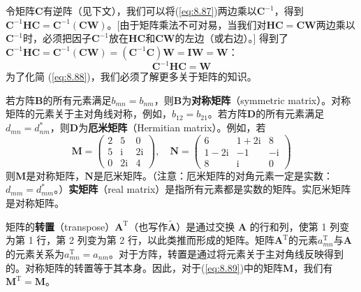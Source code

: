     令矩阵$\mathbf{C}$有逆阵（见下文），我们可以将(\ref{eq:8.87})两边乘以$\mathbf{C}^{-1}$，得到$\mathbf{C}^{-1}\mathbf{HC} = \mathbf{C}^{-1}\left(\mathbf{CW}\right)$。[由于矩阵乘法不可对易，当我们对$\mathbf{HC} = \mathbf{CW}$两边乘以$\mathbf{C}^{-1}$时，必须把因子$\mathbf{C}^{-1}$放在$\mathbf{HC}$和$\mathbf{CW}$的左边（或右边）。] 得到了$\mathbf{C}^{-1}\mathbf{HC} = \mathbf{C}^{-1}\left(\mathbf{CW}\right) = \left(\mathbf{C}^{-1}\mathbf{C}\right)\mathbf{W} = \mathbf{I}\mathbf{W} = \mathbf{W}$：
    \begin{equation}
        \mathbf{C}^{-1}\mathbf{HC} = \mathbf{W}
        \label{eq:8.88}
    \end{equation}
    为了化简 (\ref{eq:8.88})，我们必须了解更多关于矩阵的知识。

    若方阵$\mathbf{B}$的所有元素满足$b_{mn} = b_{nm}$，则$\mathbf{B}$为\textbf{对称矩阵}（symmetric matrix）。对称矩阵的元素关于主对角线对称，例如，$b_{12} = b_{21}$。若方阵$\mathbf{D}$的所有元素满足$d_{mn} = d_{nm}^{\ast}$，则$\mathbf{D}$为\textbf{厄米矩阵}（Hermitian matrix）。例如，若
    \begin{equation}
        \mathbf{M} = \begin{pmatrix}
            2 & 5 & 0 \\
            5 & \mathrm{i} & 2\mathrm{i} \\
            0 & 2\mathrm{i} & 4
        \end{pmatrix}, \quad \mathbf{N} = \begin{pmatrix}
            6 & 1 + 2\mathrm{i} & 8 \\
            1 - 2\mathrm{i} & -1 & -\mathrm{i} \\
            8 & \mathrm{i} & 0
        \end{pmatrix}
        \label{eq:8.89}
    \end{equation}
    则$\mathbf{M}$是对称矩阵，$\mathbf{N}$是厄米矩阵。（注意：厄米矩阵的对角元素一定是实数：$d_{mm} = d_{mm}^{\ast}$。）\textbf{实矩阵}（real matrix）是指所有元素都是实数的矩阵。实厄米矩阵是对称矩阵。

    矩阵的\textbf{转置}（transpose）$\mathbf{A}^{\mathrm{T}}$（也写作$\tilde{\mathbf{A}}$）是通过交换 $\mathbf{A}$ 的行和列，使第 1 列变为第 1 行，第 2 列变为第 2 行，以此类推而形成的矩阵。矩阵$\mathbf{A}^{\mathrm{T}}$的元素$a_{mn}^{\mathrm{T}}$与$\mathbf{A}$的元素关系为$a_{mn}^{\mathrm{T}} = a_{nm}$。对于方阵，转置是通过将元素关于主对角线反映得到的。对称矩阵的转置等于其本身。因此，对于(\ref{eq:8.89})中的矩阵$\mathbf{M}$，我们有$\mathbf{M}^{\mathrm{T}} = \mathbf{M}$。

